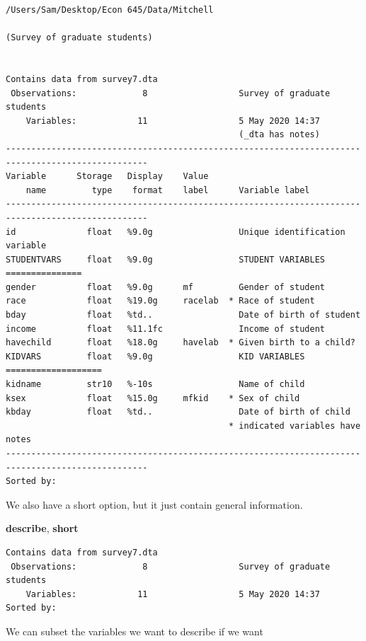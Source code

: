 \documentclass[
]{book}
\newenvironment{Shaded}{\begin{snugshade}}{\end{snugshade}}
\newcommand{\KeywordTok}[1]{\textcolor[rgb]{0.13,0.29,0.53}{\textbf{#1}}}
\newcommand{\NormalTok}[1]{#1}
\begin{document}
\begin{verbatim}
/Users/Sam/Desktop/Econ 645/Data/Mitchell

(Survey of graduate students)


Contains data from survey7.dta
 Observations:             8                  Survey of graduate students
    Variables:            11                  5 May 2020 14:37
                                              (_dta has notes)
--------------------------------------------------------------------------------------------------
Variable      Storage   Display    Value
    name         type    format    label      Variable label
--------------------------------------------------------------------------------------------------
id              float   %9.0g                 Unique identification variable
STUDENTVARS     float   %9.0g                 STUDENT VARIABLES ===============
gender          float   %9.0g      mf         Gender of student
race            float   %19.0g     racelab  * Race of student
bday            float   %td..                 Date of birth of student
income          float   %11.1fc               Income of student
havechild       float   %18.0g     havelab  * Given birth to a child?
KIDVARS         float   %9.0g                 KID VARIABLES ===================
kidname         str10   %-10s                 Name of child
ksex            float   %15.0g     mfkid    * Sex of child
kbday           float   %td..                 Date of birth of child
                                            * indicated variables have notes
--------------------------------------------------------------------------------------------------
Sorted by: 
\end{verbatim}

We also have a short option, but it just contain general information.

\begin{Shaded}
\begin{Highlighting}[]
\KeywordTok{describe}\NormalTok{, }\KeywordTok{short}
\end{Highlighting}
\end{Shaded}

\begin{verbatim}
Contains data from survey7.dta
 Observations:             8                  Survey of graduate students
    Variables:            11                  5 May 2020 14:37
Sorted by: 
\end{verbatim}

We can subset the variables we want to describe if we want
\end{document}
